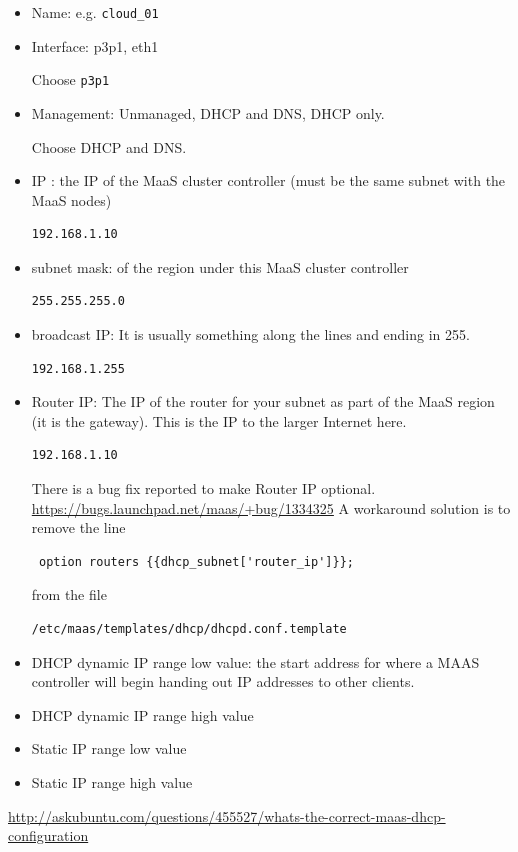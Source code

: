 \begin{itemize}
  \item Name: e.g. \verb!cloud_01!
  
  \item Interface: p3p1, eth1

Choose \verb!p3p1!
  
  \item Management: Unmanaged, DHCP and DNS, DHCP only.
  
  Choose DHCP and DNS.
  
  \item IP : the IP of the MaaS cluster controller (must be the same subnet
  with the MaaS nodes)
  
\begin{verbatim}
192.168.1.10
\end{verbatim}

  \item subnet mask: of the region under this MaaS cluster controller
\begin{verbatim}
255.255.255.0
\end{verbatim}
  
  \item broadcast IP: It is usually something along the lines and ending in 255.
\begin{verbatim}
192.168.1.255
\end{verbatim}
  
  \item Router IP: The IP of the router for your subnet as part of the MaaS
  region (it is the gateway). This is the IP to the larger Internet here.
  
\begin{verbatim}
192.168.1.10
\end{verbatim}

There is a bug fix reported to make Router IP optional.
\url{https://bugs.launchpad.net/maas/+bug/1334325} A workaround solution is to
remove the line 
\begin{verbatim}
 option routers {{dhcp_subnet['router_ip']}};
\end{verbatim}
from the file
\begin{verbatim}
/etc/maas/templates/dhcp/dhcpd.conf.template
\end{verbatim}
  
  \item DHCP dynamic IP range low value:  the start address for where a MAAS
  controller will begin handing out IP addresses to other clients. 
  
  \item DHCP dynamic IP range high value
  
  \item Static IP range low value
  
  \item Static IP range high value
\end{itemize}
\url{http://askubuntu.com/questions/455527/whats-the-correct-maas-dhcp-configuration}


